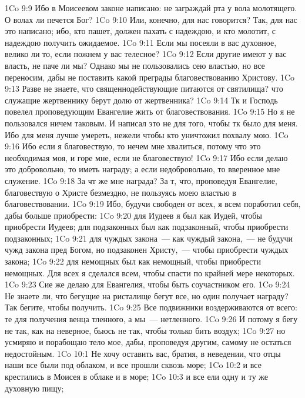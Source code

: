 \vs 1Co 9:9 Ибо в Моисеевом законе написано: не заграждай рта у вола молотящего. О волах ли печется Бог?
\vs 1Co 9:10 Или, конечно, для нас говорится? Так, для нас это написано; ибо, кто пашет, должен пахать с надеждою, и кто молотит,  с надеждою получить ожидаемое.
\vs 1Co 9:11 Если мы посеяли в вас духовное, велико ли то, если пожнем у вас телесное?
\vs 1Co 9:12 Если другие имеют у вас власть, не паче ли мы? Однако мы не пользовались сею властью, но все переносим, дабы не поставить какой преграды благовествованию Христову.
\vs 1Co 9:13 Разве не знаете, что священнодействующие питаются от святилища? что служащие жертвеннику берут долю от жертвенника?
\vs 1Co 9:14 Тк и Господь повелел проповедующим Евангелие жить от благовествования.
\vs 1Co 9:15 Но я не пользовался ничем таковым. И написал это не для того, чтобы тк было для меня. Ибо для меня лучше умереть, нежели чтобы кто уничтожил похвалу мою.
\vs 1Co 9:16 Ибо если я благовествую, то нечем мне хвалиться, потому что это необходимая  моя, и горе мне, если не благовествую!
\vs 1Co 9:17 Ибо если делаю это добровольно, то  иметь награду; а если недобровольно, то  вверенное мне служение.
\vs 1Co 9:18 За чт же мне награда? За т, что, проповедуя Евангелие, благовествую о Христе безмездно, не пользуясь моею властью в благовествовании.
\vs 1Co 9:19 Ибо, будучи свободен от всех, я всем поработил себя, дабы больше приобрести:
\vs 1Co 9:20 для Иудеев я был как Иудей, чтобы приобрести Иудеев; для подзаконных был как подзаконный, чтобы приобрести подзаконных;
\vs 1Co 9:21 для чуждых закона~--- как чуждый закона,~--- не будучи чужд закона пред Богом, но подзаконен Христу,~--- чтобы приобрести чуждых закона;
\vs 1Co 9:22 для немощных был как немощный, чтобы приобрести немощных. Для всех я сделался всем, чтобы спасти по крайней мере некоторых.
\vs 1Co 9:23 Сие же делаю для Евангелия, чтобы быть соучастником его.
\vs 1Co 9:24 Не знаете ли, что бегущие на ристалище бегут все, но один получает награду? Так бегите, чтобы получить.
\vs 1Co 9:25 Все подвижники воздерживаются от всего: те для получения венца тленного, а мы~--- нетленного.
\vs 1Co 9:26 И потому я бегу не так, как на неверное, бьюсь не так, чтобы только бить воздух;
\vs 1Co 9:27 но усмиряю и порабощаю тело мое, дабы, проповедуя другим, самому не остаться недостойным.
\vs 1Co 10:1 Не хочу оставить вас, братия, в неведении, что отцы наши все были под облаком, и все прошли сквозь море;
\vs 1Co 10:2 и все крестились в Моисея в облаке и в море;
\vs 1Co 10:3 и все ели одну и ту же духовную пищу;
